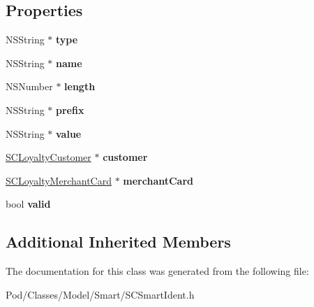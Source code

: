 \subsection*{Properties}
\begin{DoxyCompactItemize}
\item 
N\+S\+String $\ast$ {\bfseries type}\hypertarget{interface_s_c_smart_ident_ad28d25945f0020f3496fa35fba282fad}{}\label{interface_s_c_smart_ident_ad28d25945f0020f3496fa35fba282fad}

\item 
N\+S\+String $\ast$ {\bfseries name}\hypertarget{interface_s_c_smart_ident_a68e94ec15952ae93f4d263d6e94d0e92}{}\label{interface_s_c_smart_ident_a68e94ec15952ae93f4d263d6e94d0e92}

\item 
N\+S\+Number $\ast$ {\bfseries length}\hypertarget{interface_s_c_smart_ident_a2b0157744bd3f81b609225dbc1f31100}{}\label{interface_s_c_smart_ident_a2b0157744bd3f81b609225dbc1f31100}

\item 
N\+S\+String $\ast$ {\bfseries prefix}\hypertarget{interface_s_c_smart_ident_a40d9fe87413f3928e93890ab008202a8}{}\label{interface_s_c_smart_ident_a40d9fe87413f3928e93890ab008202a8}

\item 
N\+S\+String $\ast$ {\bfseries value}\hypertarget{interface_s_c_smart_ident_a1adaa175363dc6558044b09dbd4d7c4c}{}\label{interface_s_c_smart_ident_a1adaa175363dc6558044b09dbd4d7c4c}

\item 
\hyperlink{interface_s_c_loyalty_customer}{S\+C\+Loyalty\+Customer} $\ast$ {\bfseries customer}\hypertarget{interface_s_c_smart_ident_ab5b01ce33b799b4f69b31ef3174304b7}{}\label{interface_s_c_smart_ident_ab5b01ce33b799b4f69b31ef3174304b7}

\item 
\hyperlink{interface_s_c_loyalty_merchant_card}{S\+C\+Loyalty\+Merchant\+Card} $\ast$ {\bfseries merchant\+Card}\hypertarget{interface_s_c_smart_ident_af9d2c5412a45f37a0b252c2893d638e5}{}\label{interface_s_c_smart_ident_af9d2c5412a45f37a0b252c2893d638e5}

\item 
bool {\bfseries valid}\hypertarget{interface_s_c_smart_ident_af91faa1f840aee5ebec99dcd3a6b2b9d}{}\label{interface_s_c_smart_ident_af91faa1f840aee5ebec99dcd3a6b2b9d}

\end{DoxyCompactItemize}
\subsection*{Additional Inherited Members}


The documentation for this class was generated from the following file\+:\begin{DoxyCompactItemize}
\item 
Pod/\+Classes/\+Model/\+Smart/S\+C\+Smart\+Ident.\+h\end{DoxyCompactItemize}

